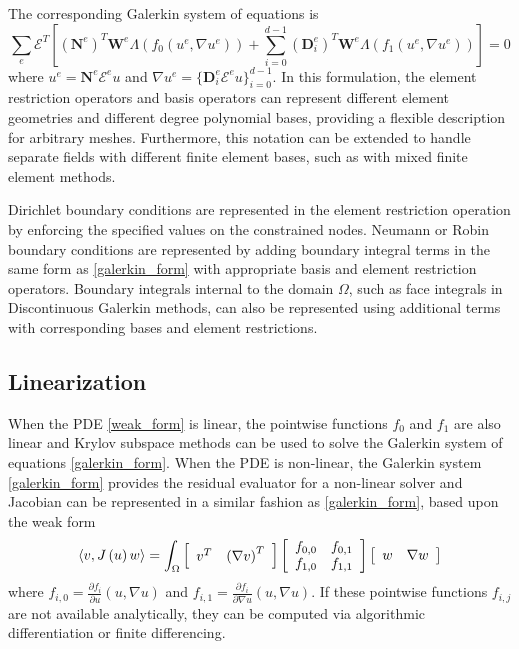 The corresponding Galerkin system of equations is
\begin{equation}
\sum_e \mathcal{E}^T \left[ \left( \mathbf{N}^e \right)^T \mathbf{W}^e \Lambda \left( f_0 \left( u^e, \nabla u^e \right) \right) + \sum_{i = 0}^{d - 1} \left( \mathbf{D}_i^e \right)^T \mathbf{W}^e \Lambda \left( f_1 \left( u^e, \nabla u^e \right) \right) \right] = 0
\label{galerkin_form}
\end{equation}
where $u^e = \mathbf{N}^e \mathcal{E}^e u$ and $\nabla u^e = \lbrace \mathbf{D}_i^e \mathcal{E}^e u \rbrace_{i = 0}^{d - 1}$.
In this formulation, the element restriction operators and basis operators can represent different element geometries and different degree polynomial bases, providing a flexible description for arbitrary meshes.
Furthermore, this notation can be extended to handle separate fields with different finite element bases, such as with mixed finite element methods.

Dirichlet boundary conditions are represented in the element restriction operation by enforcing the specified values on the constrained nodes.
Neumann or Robin boundary conditions are represented by adding boundary integral terms in the same form as \ref{galerkin_form} with appropriate basis and element restriction operators.
Boundary integrals internal to the domain $\Omega$, such as face integrals in Discontinuous Galerkin methods, can also be represented using additional terms with corresponding bases and element restrictions.

\subsection{Linearization}

When the PDE \ref{weak_form} is linear, the pointwise functions $f_0$ and $f_1$ are also linear and Krylov subspace methods can be used to solve the Galerkin system of equations \ref{galerkin_form}.
When the PDE is non-linear, the Galerkin system \ref{galerkin_form} provides the residual evaluator for a non-linear solver and Jacobian can be represented in a similar fashion as \ref{galerkin_form}, based upon the weak form
\begin{equation}
\langle v, J \left( u \right) w \rangle = \int_{\Omega}
\left[ \begin{array}{c c}
v^T & \left( \nabla v \right)^T
\end{array} \right]
\left[ \begin{array}{c c}
f_{0, 0} & f_{0, 1}\\
f_{1, 0} & f_{1, 1}
\end{array} \right]
\left[ \begin{array}{c c}
w & \nabla w
\end{array} \right]
\label{jacobian_form}
\end{equation}
where $f_{i, 0} = \frac{\partial f_i}{\partial u} \left( u, \nabla u \right)$ and $f_{i, 1} = \frac{\partial f_i}{\partial \nabla u} \left( u, \nabla u \right)$.
If these pointwise functions $f_{i, j}$ are not available analytically, they can be computed via algorithmic differentiation or finite differencing.

